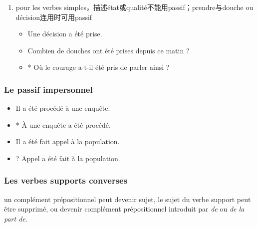 \documentclass[UTF8]{report}
\begin{document}
\begin{enumerate}
\begin{enumerate}
        \item pour les verbes simples，描述état或qualité不能用passif；prendre与douche ou décision连用时可用passif
        \begin{itemize}
            \item Une décision a été prise.
            \item Combien de douches ont été prises depuis ce matin ?
            \item * Où le courage a-t-il été pris de parler ainsi ?
        \end{itemize}
    \end{enumerate}
\end{enumerate}

\subsubsection{Le passif impersonnel}
\begin{itemize}
    \item Il a été procédé à une enquête.
    \item * À une enquête a été procédé.
    \item Il a été fait appel à la population.
    \item ? Appel a été fait à la population.
\end{itemize}

\subsubsection{Les verbes supports converses}
un complément prépositionnel peut devenir sujet, le sujet du verbe support peut être supprimé, ou devenir complément prépositionnel introduit par \textit{de} ou \textit{de la part de}.
\end{document}
